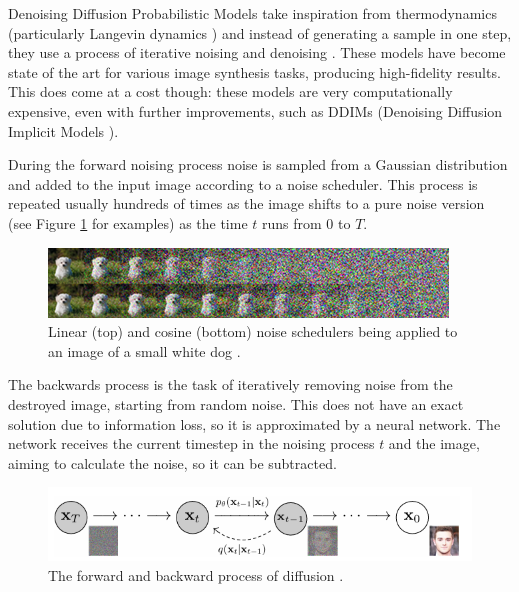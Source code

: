 	Denoising Diffusion Probabilistic Models take inspiration from thermodynamics (particularly Langevin dynamics \cite{welling2011bayesian}) and instead of generating a sample in one step, they use a process of iterative noising and denoising \cite{ho2020denoising}. These models have become state of the art for various image synthesis tasks, producing high-fidelity results. This does come at a cost though: these models are very computationally expensive, even with further improvements, such as DDIMs (Denoising Diffusion Implicit Models \cite{song2020denoising}).
	
	During the forward noising process noise is sampled from a Gaussian distribution and added to the input image according to a noise scheduler. This process is repeated usually hundreds of times as the image shifts to a pure noise version (see Figure \ref{fig:scheduler} for examples) as the time $t$ runs from 0 to $T$.
	
	\begin{figure}[!h]
		\centering
		\includegraphics[width=\textwidth]{figures/scheduler.png}
		\caption{Linear (top) and cosine (bottom) noise schedulers being applied to an image of a small white dog \cite{nichol2021improved}.}
		\label{fig:scheduler}
	\end{figure}
	
	
	The backwards process is the task of iteratively removing noise from the destroyed image, starting from random noise. This does not have an exact solution due to information loss, so it is approximated by a neural network. The network receives the current timestep in the noising process $t$ and the image, aiming to calculate the noise, so it can be subtracted.
	
	\begin{figure}[!h]
		\centering
		\includegraphics[width=\textwidth]{figures/diffusion.png}
		\caption{The forward and backward process of diffusion \cite{ho2020denoising}.}
	\end{figure}
	
